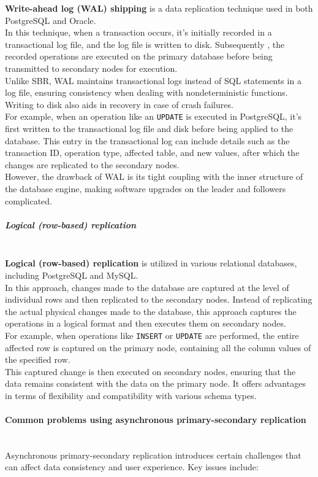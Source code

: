 \textbf{Write-ahead log (WAL) shipping} is a data replication technique used in both PostgreSQL and Oracle.
\\
In this technique, when a transaction occurs, it's initially recorded in a transactional log file, and the log file is written to disk. Subsequently , the recorded operations are executed on the primary database before being transmitted to secondary nodes for execution.
\\
Unlike SBR, WAL maintains transactional logs instead of SQL statements in a log file, ensuring consistency when dealing with nondeterministic functions. Writing to disk also aids in recovery in case of crash failures.
\\
For example, when an operation like an \texttt{UPDATE} is executed in PostgreSQL, it's first written to the transactional log file and disk before being applied to the database. This entry in the transactional log can include details such as the transaction ID, operation type, affected table, and new values, after which the changes are replicated to the secondary nodes.
\\
However, the drawback of WAL is its tight coupling with the inner structure of the database engine, making software upgrades on the leader and followers complicated.
\\
\subparagraph{Logical (row-based) replication}\label{dHiCB84akT7wBW9mj9XvP}
\\
\textbf{Logical (row-based) replication} is utilized in various relational databases, including PostgreSQL and MySQL.
\\
In this approach, changes made to the database are captured at the level of individual rows and then replicated to the secondary nodes. Instead of replicating the actual physical changes made to the database, this approach captures the operations in a logical format and then executes them on secondary nodes.
\\
For example, when operations like \texttt{INSERT} or \texttt{UPDATE} are performed, the entire affected row is captured on the primary node, containing all the column values of the specified row.
\\
This captured change is then executed on secondary nodes, ensuring that the data remains consistent with the data on the primary node. It offers advantages in terms of flexibility and compatibility with various schema types.
\\
\paragraph{Common problems using asynchronous primary-secondary replication}\label{R16Bwh-0S-YSTdJrA2YTx}
\\
Asynchronous primary-secondary replication introduces certain challenges that can affect data consistency and user experience. Key issues include:

